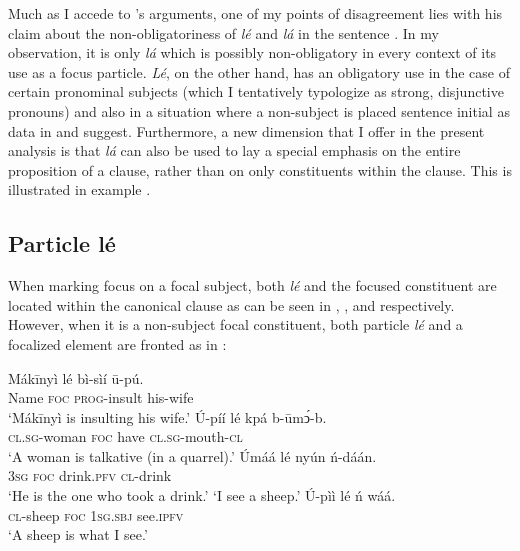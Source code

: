 \documentclass[output=paper,colorlinks,citecolor=brown]{langscibook}
\begin{document}
Much as I accede to \citeauthor{Schwarz2009}’s arguments, one of my points of disagreement lies with his claim about the non-obligatoriness of \textit{lé} and \textit{lá} in the sentence \citep[184--185]{Schwarz2009}. In my observation, it is only \textit{lá} which is possibly non-obligatory in every context of its use as a focus particle. \textit{Lé}, on the other hand, has an obligatory use in the case of certain pronominal subjects (which I tentatively typologize as strong, disjunctive pronouns) and also in a situation where a non-subject is placed sentence initial as data in  and  suggest. Furthermore, a new dimension that I offer in the present analysis is that \textit{lá} can also be used to lay a special emphasis on the entire proposition of a clause, rather than on only constituents within the clause. This is illustrated in example .

\subsection{Particle lé}\label{sec:bisilki:7.1}

When marking focus on a focal subject, both \textit{lé} and the focused constituent are located within the canonical clause as can be seen in , , and  respectively. However, when it is a non-subject focal constituent, both particle \textit{lé} and a focalized element are fronted as in :

\ea%
    \label{ex:bisilki:22}
    \ea\label{ex:bisilki:22a}
    \gll    Mákīnyì	lé	bì-sìí	ū-pú.\\
            Name	\textsc{foc}	\textsc{prog-}insult		his-wife\\
    \glt    ‘Mákīnyì is insulting his wife.’
    \ex\label{ex:bisilki:22b}
    \gll    Ú-píí			lé	kpá	b-ūmͻ́-b.\\
            \textsc{cl.sg-}woman	\textsc{foc}	have	\textsc{cl.sg-}mouth\textsc{-cl}\\
    \glt    ‘A woman is talkative (in a quarrel).’
    \ex\label{ex:bisilki:22c}
    \gll    Úmáá		lé	nyún		ń-dáán.\\
            \textsc{3sg}		\textsc{foc}	drink\textsc{.pfv}	\textsc{cl-}drink\\
    \glt    ‘He is the one who took a drink.’
    \glt    ‘I see a sheep.’
    \ex\label{ex:bisilki:22e}
    \gll    Ú-pìì		lé	ń		wáá.\\
            \textsc{cl-}sheep	\textsc{foc}	\textsc{1sg.sbj}	see\textsc{.ipfv}\\
    \glt    ‘A sheep is what I see.’
    \z
\z
\end{document}
